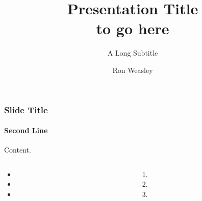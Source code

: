 \documentclass[aspectratio=169]{beamer}
\title{Presentation Title\\to go here}
\subtitle{A Long Subtitle}
\author{Ron Weasley}
\institute[Computer Science]{Liverpool}
\begin{document}
%
\begin{frame}
\maketitle
\end{frame}

\begin{frame}[t]
    \frametitle{Slide Title}
    \framesubtitle{Second Line}

    Content.
    \lipsum[1][1-2]

    \begin{columns}[T]
        \begin{column}{0.5\textwidth}
            \begin{itemize}
                \item \lipsum[1][2]
                \item \lipsum[2][2]
                \item \lipsum[3][2]
            \end{itemize}
        \end{column}

        \begin{column}{0.5\textwidth}
            \begin{enumerate}
                \item \lipsum[3][1]
                \item \lipsum[4][2]
                \item \lipsum[5][2]
            \end{enumerate}
        \end{column}
    \end{columns}
\end{frame}
\end{document}

